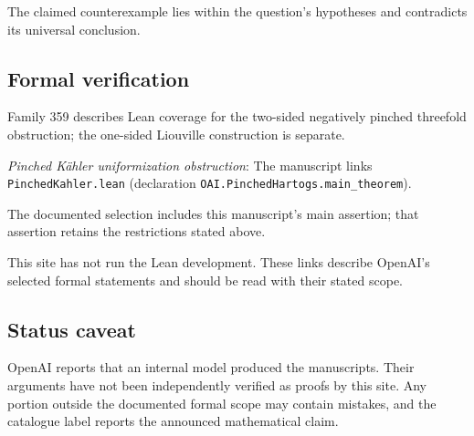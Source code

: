 \documentclass[11pt]{article}
\begin{document}
The claimed counterexample lies within the question’s hypotheses and contradicts its universal conclusion.

\subsection{Formal verification}
Family 359 describes Lean coverage for the two-sided negatively pinched threefold obstruction; the one-sided Liouville construction is separate.

\textit{Pinched Kähler uniformization obstruction}: The manuscript links \texttt{PinchedKahler.lean} (declaration \texttt{OAI.PinchedHartogs.main\_theorem}).

The documented selection includes this manuscript’s main assertion; that assertion retains the restrictions stated above.

This site has not run the Lean development. These links describe OpenAI’s selected formal statements and should be read with their stated scope.

\subsection{Status caveat}
OpenAI reports that an internal model produced the manuscripts. Their arguments have not been independently verified as proofs by this site. Any portion outside the documented formal scope may contain mistakes, and the catalogue label reports the announced mathematical claim.
\end{document}
